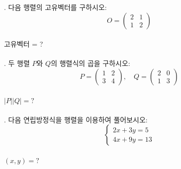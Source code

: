 \documentclass[fleqn]{article}
\begin{document}
. 다음 행렬의 고유벡터를 구하시오:  
\[
O = \begin{pmatrix}
2 & 1 \\
1 & 2
\end{pmatrix}
\]  
\\
고유벡터 = ? \\\\

. 두 행렬 \( P \)와 \( Q \)의 행렬식의 곱을 구하시오:  
\[
P = \begin{pmatrix}
1 & 2 \\
3 & 4
\end{pmatrix}, \quad 
Q = \begin{pmatrix}
2 & 0 \\
1 & 3
\end{pmatrix}
\]  
\\
\(|P||Q| = ?\) \\\\

. 다음 연립방정식을 행렬을 이용하여 풀어보시오:  
\[
\begin{cases}
2x + 3y = 5 \\
4x + 9y = 13
\end{cases}
\]  
\\
\((x, y) = ?\) \\\\\
\end{document}
